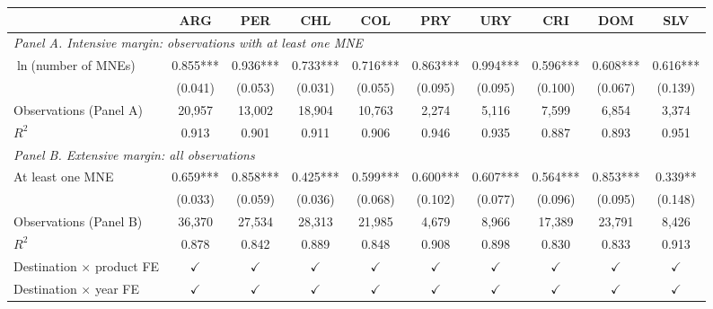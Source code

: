\begin{tabular}{l*{9}{c}}
\toprule
 & ARG & PER & CHL & COL & PRY & URY & CRI & DOM & SLV \\
\midrule
\multicolumn{10}{l}{\textit{Panel A. Intensive margin: observations with at least one MNE}} \\
$\ln$(number of MNEs) & 0.855*** & 0.936*** & 0.733*** & 0.716*** & 0.863*** & 0.994*** & 0.596*** & 0.608*** & 0.616*** \\
 & (0.041) & (0.053) & (0.031) & (0.055) & (0.095) & (0.095) & (0.100) & (0.067) & (0.139) \\
Observations (Panel A) & 20,957 & 13,002 & 18,904 & 10,763 & 2,274 & 5,116 & 7,599 & 6,854 & 3,374 \\
$R^2$ & 0.913 & 0.901 & 0.911 & 0.906 & 0.946 & 0.935 & 0.887 & 0.893 & 0.951 \\
\midrule
\multicolumn{10}{l}{\textit{Panel B. Extensive margin: all observations}} \\
At least one MNE & 0.659*** & 0.858*** & 0.425*** & 0.599*** & 0.600*** & 0.607*** & 0.564*** & 0.853*** & 0.339** \\
 & (0.033) & (0.059) & (0.036) & (0.068) & (0.102) & (0.077) & (0.096) & (0.095) & (0.148) \\
Observations (Panel B) & 36,370 & 27,534 & 28,313 & 21,985 & 4,679 & 8,966 & 17,389 & 23,791 & 8,426 \\
$R^2$ & 0.878 & 0.842 & 0.889 & 0.848 & 0.908 & 0.898 & 0.830 & 0.833 & 0.913 \\
\midrule
Destination $\times$ product FE & $\checkmark$ & $\checkmark$ & $\checkmark$ & $\checkmark$ & $\checkmark$ & $\checkmark$ & $\checkmark$ & $\checkmark$ & $\checkmark$ \\
Destination $\times$ year FE & $\checkmark$ & $\checkmark$ & $\checkmark$ & $\checkmark$ & $\checkmark$ & $\checkmark$ & $\checkmark$ & $\checkmark$ & $\checkmark$ \\
\bottomrule
\end{tabular}
